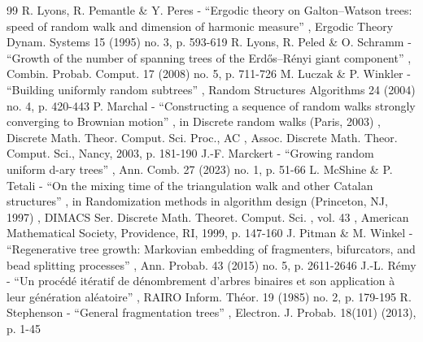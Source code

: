 \documentclass[11pt]{article}
\theoremstyle{definition}
\begin{document}
\begin{thebibliography}{99}
 R. Lyons, R. Pemantle \& Y. Peres - “Ergodic theory on Galton–Watson trees: speed of random walk and dimension of harmonic measure” , Ergodic Theory Dynam. Systems 15 (1995) no. 3, p. 593-619
 R. Lyons, R. Peled \& O. Schramm - “Growth of the number of spanning trees of the Erdős–Rényi giant component” , Combin. Probab. Comput. 17 (2008) no. 5, p. 711-726
 M. Luczak \& P. Winkler - “Building uniformly random subtrees” , Random Structures Algorithms 24 (2004) no. 4, p. 420-443
 P. Marchal - “Constructing a sequence of random walks strongly converging to Brownian motion” , in Discrete random walks (Paris, 2003) , Discrete Math. Theor. Comput. Sci. Proc., AC , Assoc. Discrete Math. Theor. Comput. Sci., Nancy, 2003, p. 181-190
 J.-F. Marckert - “Growing random uniform d-ary trees” , Ann. Comb. 27 (2023) no. 1, p. 51-66
 L. McShine \& P. Tetali - “On the mixing time of the triangulation walk and other Catalan structures” , in Randomization methods in algorithm design (Princeton, NJ, 1997) , DIMACS Ser. Discrete Math. Theoret. Comput. Sci. , vol. 43 , American Mathematical Society, Providence, RI, 1999, p. 147-160
 J. Pitman \& M. Winkel - “Regenerative tree growth: Markovian embedding of fragmenters, bifurcators, and bead splitting processes” , Ann. Probab. 43 (2015) no. 5, p. 2611-2646
 J.-L. Rémy - “Un procédé itératif de dénombrement d’arbres binaires et son application à leur génération aléatoire” , RAIRO Inform. Théor. 19 (1985) no. 2, p. 179-195
 R. Stephenson - “General fragmentation trees” , Electron. J. Probab. 18(101) (2013), p. 1-45
\end{thebibliography}
\end{document}
